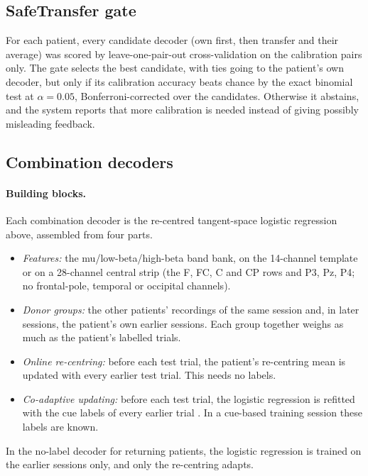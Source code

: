 \documentclass[11pt]{article}
\begin{document}
\subsection{SafeTransfer gate}

For each patient, every candidate decoder (own first, then transfer and their average) was scored by leave-one-pair-out cross-validation on the calibration pairs only. The gate selects the best candidate, with ties going to the patient's own decoder, but only if its calibration accuracy beats chance by the exact binomial test at $\alpha = 0.05$, Bonferroni-corrected over the candidates. Otherwise it abstains, and the system reports that more calibration is needed instead of giving possibly misleading feedback.

\subsection{Combination decoders}
\label{sec:combo-method}

\paragraph{Building blocks.} Each combination decoder is the re-centred tangent-space logistic regression above, assembled from four parts.
\begin{itemize}
  \item \emph{Features:} the mu/low-beta/high-beta band bank, on the 14-channel template or on a 28-channel central strip (the F, FC, C and CP rows and P3, Pz, P4; no frontal-pole, temporal or occipital channels).
  \item \emph{Donor groups:} the other patients' recordings of the same session and, in later sessions, the patient's own earlier sessions. Each group together weighs as much as the patient's labelled trials.
  \item \emph{Online re-centring:} before each test trial, the patient's re-centring mean is updated with every earlier test trial. This needs no labels.
  \item \emph{Co-adaptive updating:} before each test trial, the logistic regression is refitted with the cue labels of every earlier trial \citep{vidaurre2011}. In a cue-based training session these labels are known.
\end{itemize}
In the no-label decoder for returning patients, the logistic regression is trained on the earlier sessions only, and only the re-centring adapts.
\end{document}
